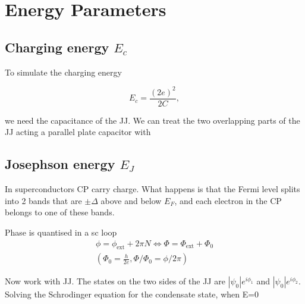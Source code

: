 \section{Energy Parameters\label{app:energy_parameters}}
\subsection{Charging energy $ E_c $}
To simulate the charging energy
 
 \begin{equation}\label{eqn:sim_1}
   E_c = \frac{(2e)^2}{2C},
 \end{equation}
 
 \noindent we need the capacitance of the JJ. We can treat the two overlapping parts of the JJ
 acting a parallel plate capacitor with
 
 
 \subsection{Josephson energy $ E_J $}
 In superconductors CP carry charge. What happens is  that the Fermi level splits into 2 bands
 that are $\pm\Delta$  above and below $E_F$, and each  electron in the CP belongs to  one of these
 bands.
  
  
 {{ Phase is quantised in a sc loop
     \begin{equation}
       \begin{aligned}
         \phi = \phi_\text{ext} + 2\pi N \Leftrightarrow \Phi = \Phi_\text{ext} + \Phi_0 \\(\Phi_0 = \frac{h}{2e}, \Phi/\Phi_0=\phi/2\pi)
       \end{aligned}
     \end{equation}
   }}
  
 Now work with  JJ. The states on the  two sides of the JJ  are $\left|\psi_0\right|e^{i\phi_1}$ and
 $\left|\psi_0\right|e^{i\phi_2}$. Solving the  Schrodinger equation for the  condensate state, when
 E=0
  
